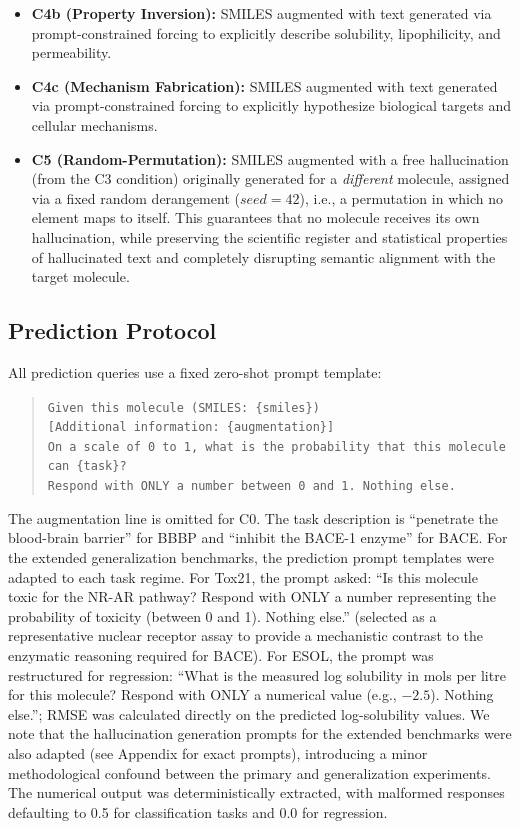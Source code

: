 \begin{itemize}
    \item \textbf{C4b (Property Inversion):} SMILES augmented with text generated via prompt-constrained forcing to explicitly describe solubility, lipophilicity, and permeability.
    \item \textbf{C4c (Mechanism Fabrication):} SMILES augmented with text generated via prompt-constrained forcing to explicitly hypothesize biological targets and cellular mechanisms.
    \item \textbf{C5 (Random-Permutation):} SMILES augmented with a free hallucination (from the C3 condition) originally generated for a \emph{different} molecule, assigned via a fixed random derangement ($seed=42$), i.e., a permutation in which no element maps to itself. This guarantees that no molecule receives its own hallucination, while preserving the scientific register and statistical properties of hallucinated text and completely disrupting semantic alignment with the target molecule.
\end{itemize}

\subsection{Prediction Protocol}
All prediction queries use a fixed zero-shot prompt template:

\begin{quote}
\texttt{Given this molecule (SMILES: \{smiles\})}\\
\texttt{[Additional information: \{augmentation\}]}\\
\texttt{On a scale of 0 to 1, what is the probability that this molecule can \{task\}?}\\
\texttt{Respond with ONLY a number between 0 and 1. Nothing else.}
\end{quote}

The augmentation line is omitted for C0. The task description is ``penetrate the blood-brain barrier'' for BBBP and ``inhibit the BACE-1 enzyme'' for BACE. For the extended generalization benchmarks, the prediction prompt templates were adapted to each task regime. For Tox21, the prompt asked: ``Is this molecule toxic for the NR-AR pathway? Respond with ONLY a number representing the probability of toxicity (between 0 and 1). Nothing else.'' (selected as a representative nuclear receptor assay to provide a mechanistic contrast to the enzymatic reasoning required for BACE). For ESOL, the prompt was restructured for regression: ``What is the measured log solubility in mols per litre for this molecule? Respond with ONLY a numerical value (e.g., $-2.5$). Nothing else.''; RMSE was calculated directly on the predicted log-solubility values. We note that the hallucination generation prompts for the extended benchmarks were also adapted (see Appendix for exact prompts), introducing a minor methodological confound between the primary and generalization experiments. The numerical output was deterministically extracted, with malformed responses defaulting to 0.5 for classification tasks and 0.0 for regression.

